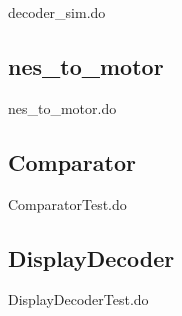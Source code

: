\documentclass[a4paper]{article}
\begin{document}
decoder\_sim.do


\clearpage

\subsection{nes\_to\_motor}
nes\_to\_motor.do


\subsection{Comparator}
ComparatorTest.do


\subsection{DisplayDecoder}
DisplayDecoderTest.do

\end{document}
